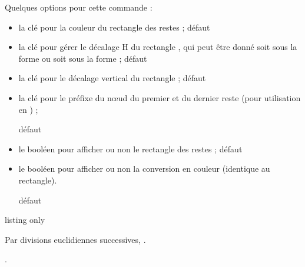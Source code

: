 \begin{cautionblock}
Quelques options pour cette commande :

\begin{itemize}
\item la clé  pour la couleur du \og rectangle \fg{} des restes ; \hfill{}défaut 
\item la clé  pour gérer le décalage H du \og rectangle \fg{}, qui peut être donné soit sous la forme  ou soit sous la forme ; \hfill{}défaut \Cle{2pt}
\item la clé  pour le décalage vertical du \og rectangle \fg{} ; \hfill{}défaut \Cle{3pt}
\item la clé  pour le préfixe du nœud du premier et du dernier reste (pour utilisation en \TikZ) ;

\hfill{}défaut 
\item le booléen  pour afficher ou non le \og rectangle \fg{} des restes ; \hfill{}défaut 
\item le booléen  pour afficher ou non la conversion en couleur (identique au rectangle).

\hfill{}défaut 
\end{itemize}
\vspace*{-\baselineskip}\leavevmode
\end{cautionblock}

\begin{PresCodeTexPL}{listing only}

Par divisions euclidiennes successives, .


.
\end{PresCodeTexPL}

